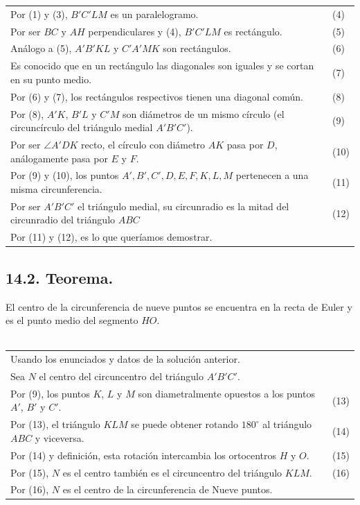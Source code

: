 \documentclass[12pt,a4paper]{article}
\begin{document}
\begin{tabular}{p{15.9 cm} p{1cm}}
\\Por (1) y (3), $B'C'LM$ es un paralelogramo. &(4)
\\Por ser $BC$ y $AH$ perpendiculares y (4), $B'C'LM$ es rectángulo. &(5)
\\ Análogo a (5), $A'B'KL$ y $C'A'MK$ son rectángulos. &(6)
\\Es conocido que en un rectángulo las diagonales son iguales y se cortan en su punto medio. &\medskip(7)
\\Por (6) y (7), los rectángulos respectivos tienen una diagonal común. &(8)
\\ Por (8), $A'K$, $B'L$ y $C'M$ son diámetros de un mismo círculo (el circuncírculo del triángulo medial $A'B'C'$). &\medskip (9)
\\Por ser $\angle A'DK$ recto, el círculo con diámetro $AK$ pasa por $D$, análogamente pasa por $E$ y $F$. &\medskip(10)
\\Por (9) y (10), los puntos $A', B', C', D, E ,F, K, L, M$ pertenecen a una misma circunferencia. &\medskip(11)
\\Por ser $A'B'C'$ el triángulo medial, su circunradio es la mitad del circunradio del triángulo $ABC$ &\medskip(12)
\\Por (11) y (12), es lo que queríamos demostrar.
\end{tabular}
\subsection*{14.2. Teorema.}
El centro de la circunferencia de nueve puntos se encuentra en la recta de Euler y es el punto medio del segmento $HO$.\\\\
\begin{tabular}{p{15.9cm} p{1 cm}}
Usando los enunciados y datos de la solución anterior.
\\Sea $N$ el centro del circuncentro del triángulo $A'B'C'$.
\\Por (9), los puntos $K$, $L$ y $M$ son diametralmente opuestos a los puntos $A'$, $B'$ y $C'$. & (13)
\\Por (13), el triángulo $KLM$ se puede obtener rotando $180^\circ$ al triángulo $ABC$ y viceversa.  &(14)
\\Por (14) y definición, esta rotación intercambia los ortocentros $H$ y $O$.&(15)
\\Por (15), $N$ es el centro también es el circuncentro del triángulo $KLM$. & (16)
\\Por (16), $N$ es el centro de la circunferencia de Nueve puntos.
\end{tabular}
\end{document}
